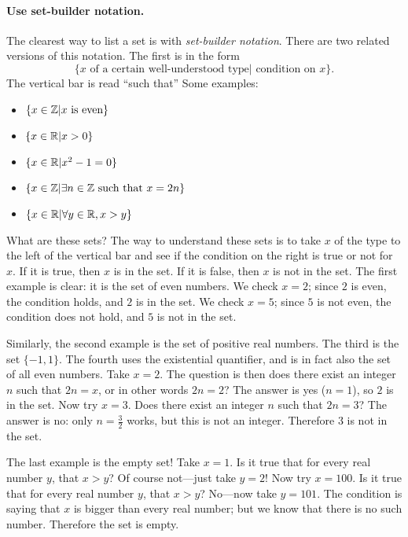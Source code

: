 \documentclass{tufte-book}
\begin{document}
\paragraph{Use set-builder notation.}
\label{sec:use-set-builder}

The clearest way to list a set is with \emph{set-builder notation}. There are two related versions of this notation. The first is in the form
\[
\{ x \text{ of a certain well-understood type} | \text{ condition on } x\}.
\]
The vertical bar is read ``such that'' Some examples:
\begin{itemize}
    \item $\{x \in \mathbb{Z} | x \text{ is even}\}$
    \item $\{x \in \mathbb{R} | x > 0 \}$
    \item $\{x \in \mathbb{R} | x^2 - 1 = 0\}$
    \item $\{x \in \mathbb{Z} | \exists n \in \mathbb{Z} \text{ such that } x = 2n\}$
    \item $\{x \in \mathbb{R} | \forall y \in \mathbb{R}, x > y\}$
\end{itemize}
What are these sets? The way to understand these sets is to take $x$ of the type to the left of the vertical bar and see if the condition on the right is true or not for $x$. If it is true, then $x$ is in the set. If it is false, then $x$ is not in the set. The first example is clear: it is the set of even numbers. We check $x = 2$; since $2$ is even, the condition holds, and $2$ is in the set. We check $x = 5$; since $5$ is not even, the condition does not hold, and $5$ is not in the set.

Similarly, the second example is the set of positive real numbers. The third is the set $\{-1, 1\}$. The fourth uses the existential quantifier, and is in fact also the set of all even numbers. Take $x = 2$. The question is then does there exist an integer $n$ such that $2n = x$, or in other words $2n = 2$? The answer is yes ($n = 1$), so $2$ is in the set. Now try $x = 3$. Does there exist an integer $n$ such that $2n = 3$? The answer is no: only $n = \frac32$ works, but this is not an integer. Therefore $3$ is not in the set. 

The last example is the empty set! Take $x = 1$. Is it true that for every real number $y$, that $x > y$? Of course not---just take $y = 2$! Now try $x = 100$. Is it true that for every real number $y$, that $x > y$? No---now take $y = 101$. The condition is saying that $x$ is bigger than every real number; but we know that there is no such number. Therefore the set is empty.
\end{document}
